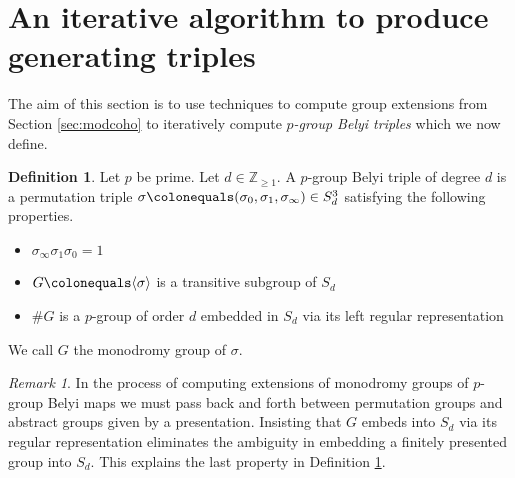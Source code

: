 \documentclass{dcthesis}
\newcommand{\ZZ}{\mathbb Z}
\newcommand{\defi}[1]{\textsf{#1}}
\newtheorem{lemma}[prop]{Lemma}
\theoremstyle{definition}
\newtheorem{definition}[prop]{Definition}
\theoremstyle{remark}
\newtheorem{remark}[prop]{Remark}
\numberwithin{equation}{section}
\numberwithin{figure}{section}
\begin{document}
{  \section{An iterative algorithm to produce generating triples}{\label{sec:triplesalgorithm}
    The aim of this section is to use
    techniques to compute group
    extensions from Section \ref{sec:modcoho}
    to iteratively
    compute \emph{$p$-group Belyi triples}
    which we now define.
    \begin{definition}
      \label{def:pgroupbelyitriple}
      Let $p$ be prime.
      Let $d\in\ZZ_{\geq 1}$.
      A \defi{$p$-group Belyi triple
      of degree $d$}
      is a permutation triple
      $\sigma\colonequals
      (\sigma_0,\sigma_1,\sigma_\infty)\in S_d^3$
      satisfying the following properties.
      \begin{itemize}
        \item
          $\sigma_\infty\sigma_1\sigma_0=1$
        \item
          $G\colonequals\langle\sigma\rangle$ is a transitive
          subgroup of $S_d$
        \item
          $\#G$ is a $p$-group
          of order $d$
          embedded in $S_d$
          via its left regular representation
      \end{itemize}
      We call $G$ the
      \defi{monodromy group of $\sigma$}.
    \end{definition}
    \begin{remark}
      \label{rmk:leftregularrepn}
      In the process of computing extensions of
      monodromy groups of $p$-group Belyi maps
      we must pass back and forth
      between permutation groups
      and
      abstract groups given by a presentation.
      Insisting that $G$ embeds into $S_d$
      via its regular representation
      eliminates the ambiguity
      in embedding a finitely presented group
      into $S_d$.
      This explains the last property
      in Definition \ref{def:pgroupbelyitriple}.
    \end{remark}
}}
\end{document}
